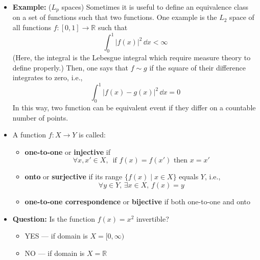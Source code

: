 \documentclass[11pt,twoside]{report}
\newcommand{\bbR}{{\mathbb{R}}}
\begin{document}
\begin{itemize}
\item \textbf{Example:} ($L_p$ spaces) Sometimes it is useful to define an equivalence class on a set of functions such that two functions. One example is the $L_2$ space of all functions $f \colon [0,1] \to \bbR$  such that
\[
\int_0^1| f(x)|^2 \, \dd x < \infty
\]
(Here, the integral is the Lebesgue integral which require measure theory to define properly.) Then, one says that $f\sim g$ if the square of their difference integrates to zero, i.e., 
\[
\int_0^1 | f(x) - g(x)|^2  \, \dd x  = 0 
\]
In this way, two function can be equivalent event if they differ on a countable number of points. 


\item A function $f \colon X \to Y$ is called: 
\begin{itemize}
  \item \textbf{one-to-one} or \textbf{injective} if
  \[
  \forall x,x'\in X, \,  \text{ if $f(x)=f(x')$ then $x=x'$} 
  \]
  
  \item \textbf{onto} or \textbf{surjective} if its range $\{ f(x) \mid x\in X\}$ equals $Y$, i.e., 
    \[
  \forall y\in Y, \,  \exists x \in X, \,   f(x) = y %
  \]
  
  \item \textbf{one-to-one correspondence} or \textbf{bijective} if both one-to-one and onto
\end{itemize}


\item \textbf{Question:} Is the function $f(x) = x^2$ invertible?
\begin{itemize}
\item YES --- if domain is $X = [0, \infty)$
\item NO --- if domain is $X =\bbR$
\end{itemize}


\end{itemize}
\end{document}
